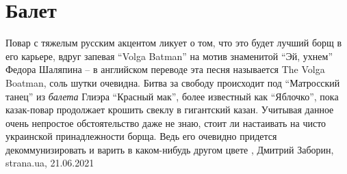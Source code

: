  
 
 
 
 
\chapter{Балет}
\label{sec:slova.balet}

Повар с тяжелым русским акцентом ликует о том, что это будет лучший борщ в его
карьере, вдруг запевая \enquote{Volga Batman} на мотив знаменитой \enquote{Эй, ухнем} Федора
Шаляпина – в английском переводе эта песня называется The Volga Boatman, соль
шутки очевидна. Битва за свободу происходит под \enquote{Матросский танец} из \emph{балета}
Глиэра \enquote{Красный мак}, более известный как \enquote{Яблочко}, пока казак-повар
продолжает крошить свеклу в гигантский казан.  Учитывая данное очень непростое
обстоятельство даже не знаю, стоит ли настаивать на чисто украинской
принадлежности борща. Ведь его очевидно придется декоммунизировать и варить в
каком-нибудь другом цвете
, 
Дмитрий Заборин, strana.ua, 21.06.2021


